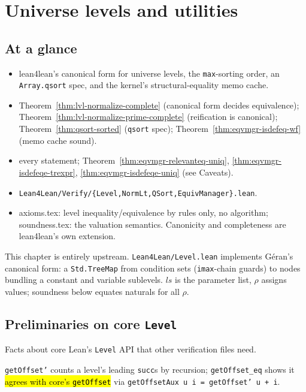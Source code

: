 \chapter{Universe levels and utilities}
\label{chap:levels}

\section*{At a glance}
\begin{itemize}
\item {} lean4lean's canonical form for universe levels, the \texttt{max}-sorting order, an
\texttt{Array.qsort} spec, and the kernel's structural-equality memo cache.
\item {} Theorem~\ref{thm:lvl-normalize-complete} (canonical form decides
equivalence); Theorem~\ref{thm:lvl-normalize-prime-complete} (reification is canonical);
Theorem~\ref{thm:qsort-sorted} (\texttt{qsort} spec); Theorem~\ref{thm:eqvmgr-isdefeq-wf} (memo cache
sound).
\item {} \stProved{} every statement; \stTainted{}
Theorem~\ref{thm:eqvmgr-relevanteq-uniq}, \ref{thm:eqvmgr-isdefeqe-trexpr}, \ref{thm:eqvmgr-isdefeqe-uniq}
(see Caveats).
\item {} \texttt{Lean4Lean/Verify/\{Level,NormLt,QSort,EquivManager\}.lean}.
\item {} axioms.tex: level inequality/equivalence by rules only, no algorithm; soundness.tex:
the valuation semantics. Canonicity and completeness are lean4lean's own extension.
\end{itemize}

This chapter is entirely upstream. \texttt{Lean4Lean/Level.lean} implements G\'eran's canonical form: a
\texttt{Std.TreeMap} from condition sets (\texttt{imax}-chain guards) to nodes bundling a constant and
variable sublevels. $ls$ is the parameter list, $\rho$ assigns values; soundness below equates naturals
for all $\rho$.

\section{Preliminaries on core \texttt{Level}}

Facts about core Lean's \texttt{Level} API that other verification files need.

\begin{definition}
\label{def:lvl-getoffset}
\leanok
{}

 \texttt{getOffset'} counts a level's leading \texttt{succ}s by recursion; \texttt{getOffset\_eq}
shows it \hl{agrees with core's \texttt{getOffset}} via \texttt{getOffsetAux u i = getOffset' u + i}.
\end{definition}

